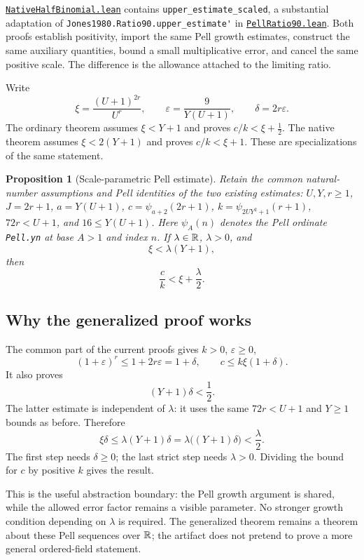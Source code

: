 \documentclass[11pt]{article}
\newtheorem{proposition}{Proposition}[section]
\theoremstyle{remark}\newtheorem{remark}[proposition]{Remark}
\newcommand{\code}[1]{\nolinkurl{#1}}
\newcommand{\sref}[2]{\href{https://github.com/VladimirReshetnikov/ProveIt/blob/7fa06d530df54d4aeb2e18027409df082234c69e/#1}{#2}}
\newcommand{\source}[1]{\sref{Computability/DiophantineConsistency/Lean/DiophantineConsistency/#1.lean}{\code{#1.lean}}}
\begin{document}
\source{NativeHalfBinomial} contains \code{upper_estimate_scaled}, a substantial adaptation of \code{Jones1980.Ratio90.upper_estimate'} in
\sref{Computability/HilbertTenthProblem/Lean/Diophantine/Paper1980/PellRatio90.lean}{\code{PellRatio90.lean}}. Both proofs establish positivity, import the same Pell growth estimates, construct the same auxiliary quantities, bound a small multiplicative error, and cancel the same positive scale. The difference is the allowance attached to the limiting ratio.

Write
\[
 \xi=\frac{(U+1)^{2r}}{U^r},\qquad
 \varepsilon=\frac{9}{Y(U+1)},\qquad
 \delta=2r\varepsilon.
\]
The ordinary theorem assumes \(\xi<Y+1\) and proves \(c/k<\xi+\tfrac12\). The native theorem assumes \(\xi<2(Y+1)\) and proves \(c/k<\xi+1\). These are specializations of the same statement.

\begin{proposition}[Scale-parametric Pell estimate]
Retain the common natural-number assumptions and Pell identities of the two existing estimates: \(U,Y,r\ge1\), \(J=2r+1\), \(a=Y(U+1)\), \(c=\psi_{a+2}(2r+1)\), \(k=\psi_{2UY^2+1}(r+1)\), \(72r<U+1\), and \(16\le Y(U+1)\). Here \(\psi_A(n)\) denotes the Pell ordinate \code{Pell.yn} at base \(A>1\) and index \(n\). If \(\lambda\in\mathbb{R}\), \(\lambda>0\), and
\[
 \xi<\lambda(Y+1),
\]
then
\[
 \frac ck<\xi+\frac{\lambda}{2}.
\]
\end{proposition}

\subsection{Why the generalized proof works}

The common part of the current proofs gives \(k>0\), \(\varepsilon\ge0\),
\[
 (1+\varepsilon)^r\le1+2r\varepsilon=1+\delta,
 \qquad c\le k\xi(1+\delta).
\]
It also proves
\[
 (Y+1)\delta<\frac12.
\]
The latter estimate is independent of \(\lambda\): it uses the same \(72r<U+1\) and \(Y\ge1\) bounds as before. Therefore
\[
 \xi\delta
 \le \lambda(Y+1)\delta
 =\lambda\bigl((Y+1)\delta\bigr)
 <\frac{\lambda}{2}.
\]
The first step needs \(\delta\ge0\); the last strict step needs \(\lambda>0\). Dividing the bound for \(c\) by positive \(k\) gives the result.

This is the useful abstraction boundary: the Pell growth argument is shared, while the allowed error factor remains a visible parameter. No stronger growth condition depending on \(\lambda\) is required. The generalized theorem remains a theorem about these Pell sequences over \(\mathbb{R}\); the artifact does not pretend to prove a more general ordered-field statement.
\end{document}
